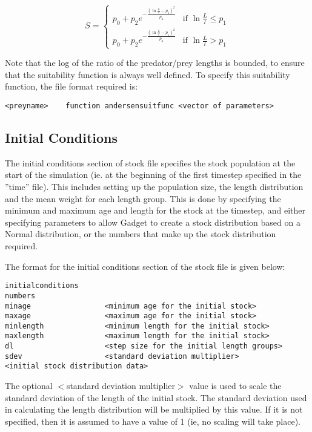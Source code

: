 \documentclass [a4paper, 10pt]{book}
\begin{document}
\begin{equation}\label{eq:andersensuit}
S =
\begin{cases}
  p_0 + p_2e^{-\frac{(\ln\frac{L}{l} - p_1)^2}{p_4}}
  & \textrm{if $\ln\frac{L}{l} \leq p_1$}\\
  p_0 + p_2e^{-\frac{(\ln\frac{L}{l} - p_1)^2}{p_3}}
  & \textrm{if $\ln\frac{L}{l} > p_1$}
\end{cases}
\end{equation}

\bigskip
Note that the log of the ratio of the predator/prey lengths is bounded, to ensure that the suitability function is always well defined.  To specify this suitability function, the file format required is:

{\small\begin{verbatim}
<preyname>    function andersensuitfunc <vector of parameters>
\end{verbatim}}

\subsection{Initial Conditions}\label{subsec:stockinitial}
The initial conditions section of stock file specifies the stock population at the start of the simulation (ie. at the beginning of the first timestep specified in the ''time'' file).  This includes setting up the population size, the length distribution and the mean weight for each length group.  This is done by specifying the minimum and maximum age and length for the stock at the timestep, and either specifying parameters to allow Gadget to create a stock distribution based on a Normal distribution, or the numbers that make up the stock distribution required.

\newpage
The format for the initial conditions section of the stock file is given below:

{\small\begin{verbatim}
initialconditions
numbers
minage                 <minimum age for the initial stock>
maxage                 <maximum age for the initial stock>
minlength              <minimum length for the initial stock>
maxlength              <maximum length for the initial stock>
dl                     <step size for the initial length groups>
sdev                   <standard deviation multiplier>
<initial stock distribution data>
\end{verbatim}}

The optional $<$standard deviation multiplier$>$ value is used to scale the standard deviation of the length of the initial stock.  The standard deviation used in calculating the length distribution will be multiplied by this value.  If it is not specified, then it is assumed to have a value of 1 (ie, no scaling will take place).
\end{document}
